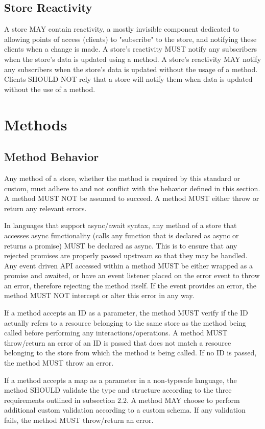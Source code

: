 \documentclass{article}
\begin{document}
\subsection{Store Reactivity}
A store MAY contain reactivity, a mostly invisible component dedicated to allowing points of access (clients) to "subscribe" to the store, and notifying these clients when a change is made. A store's reactivity MUST notify any subscribers when the store's data is updated using a method. A store's reactivity MAY notify any subscribers when the store's data is updated without the usage of a method. Clients SHOULD NOT rely that a store will notify them when data is updated without the use of a method.

\section{Methods}

\subsection{Method Behavior}
Any method of a store, whether the method is required by this standard or custom, must adhere to and not conflict with the behavior defined in this section. A method MUST NOT be assumed to succeed. A method MUST either throw or return any relevant errors.

In languages that support async/await syntax, any method of a store that accesses async functionality (calls any function that is declared as async or returns a promise) MUST be declared as async. This is to ensure that any rejected promises are properly passed upstream so that they may be handled. Any event driven API accessed within a method MUST be either wrapped as a promise and awaited, or have an event listener placed on the error event to throw an error, therefore rejecting the method itself. If the event provides an error, the method MUST NOT intercept or alter this error in any way.

If a method accepts an ID as a parameter, the method MUST verify if the ID actually refers to a resource belonging to the same store as the method being called before performing any interactions/operations. A method MUST throw/return an error of an ID is passed that does not match a resource belonging to the store from which the method is being called. If no ID is passed, the method MUST throw an error. 

If a method accepts a map as a parameter in a non-typesafe language, the method SHOULD validate the type and structure according to the three requirements outlined in subsection 2.2. A method MAY choose to perform additional custom validation according to a custom schema. If any validation fails, the method MUST throw/return an error.
\end{document}
